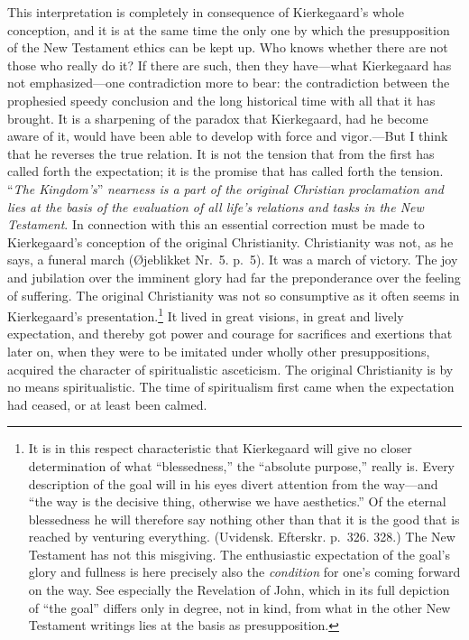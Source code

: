 \documentclass[12pt,a4paper]{book}
\newcommand{\opage}[1]{\marginnote{\footnotesize\textit{[#1]}}}
\begin{document}
This interpretation is completely in consequence of Kierkegaard's whole
conception, and it is at the same time the only one by which the
presupposition of the New Testament ethics can be kept up. Who knows
whether there are not those who really do it? If there are such, then
they have---what Kierkegaard has not emphasized---one contradiction more
to bear: the contradiction between the prophesied speedy conclusion and
the long historical time with all that it has brought. It is a
sharpening of the paradox that Kierkegaard, had he become aware of it,
would have been able to develop with force and vigor.---But I think that
he reverses the true relation. It is not the tension that from the first
has called forth the expectation; it is the promise that has called forth
the tension. ``\textit{The Kingdom's}'' \textit{nearness is
a part of the original Christian proclamation and lies at the basis of
the evaluation of all life's relations and tasks in the New Testament}.
In connection with this an essential correction must be made to
Kierkegaard's conception of the original Christianity. Christianity was
not, as he says, a funeral march (Øjeblikket Nr.~5. p.~5). It was a march
of victory. The joy and jubilation over the imminent glory had far the
preponderance over the feeling of suffering. The original Christianity
was not so consumptive as it often seems in Kierkegaard's
presentation.\footnote{It is in this respect characteristic that
Kierkegaard will give no closer determination of what ``blessedness,''
the ``absolute purpose,'' really is. Every description of the goal will
in his eyes divert attention from the way---and ``the way is the decisive
thing, otherwise we have aesthetics.'' Of the eternal blessedness he will
therefore say nothing other than that it is the good that is reached by
venturing everything. (Uvidensk. Efterskr. p.~326. 328.) The New
Testament has not this misgiving. The enthusiastic expectation of the
goal's glory and fullness is here precisely also the \textit{condition}
for one's coming forward on the way. See especially the Revelation of
John, which in its full depiction of ``the goal'' differs only in degree,
not in kind, from what in the other New Testament writings lies at the
basis as presupposition.}
\opage{155}It lived in great visions, in great and lively expectation,
and thereby got power and courage for sacrifices and exertions that later
on, when they were to be imitated under wholly other presuppositions,
acquired the character of spiritualistic asceticism. The original
Christianity is by no means spiritualistic. The time of spiritualism
first came when the expectation had ceased, or at least been calmed.
\end{document}
